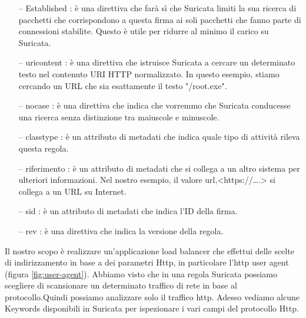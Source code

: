 \documentclass[binding=0.6cm]{sapthesis}
\theoremstyle{definition}
\begin{document}
\begin{itemize}[topsep=10pt, noitemsep]
    \item[--] Established : è una direttiva che farà sì che Suricata limiti la sua ricerca di pacchetti che corrispondono a questa firma ai soli pacchetti che fanno parte di connessioni stabilite. Questo è utile per ridurre al minimo il carico su Suricata.

    \item[--] uricontent : è una direttiva che istruisce Suricata a cercare un determinato testo nel contenuto URI HTTP normalizzato. In questo esempio, stiamo cercando un URL che sia esattamente il testo "/root.exe".

    \item[--] nocase : è una direttiva che indica che vorremmo che Suricata conducesse una ricerca senza distinzione tra maiuscole e minuscole.

    \item[--] classtype : è un attributo di metadati che indica quale tipo di attività rileva questa regola.

    \item[--] riferimento :  è un attributo di metadati che si collega a un altro sistema per ulteriori informazioni. Nel nostro esempio, il valore url,<https://….> si collega a un URL su Internet.

    \item[--] sid : è un attributo di metadati che indica l'ID della firma.

    \item[--] rev : è una direttiva che indica la versione della regola. 

\end{itemize}



Il nostro scopo è realizzare un'applicazione load balancer che effettui delle scelte di 
indirizzamento in base a dei parametri Http, in particolare l'http user agent
(figura \ref{fig:user-agent}).
Abbiamo visto che in una regola Suricata possiamo scegliere di scansionare un determinato
traffico di rete in base al protocollo.Quindi possiamo analizzare solo il traffico http.
Adesso vediamo alcune Keywords disponibili in Suricata per ispezionare i vari campi
del protocollo Http.
\end{document}
